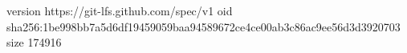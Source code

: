 version https://git-lfs.github.com/spec/v1
oid sha256:1be998bb7a5d6df19459059baa94589672ce4ce00ab3c86ac9ee56d3d3920703
size 174916

